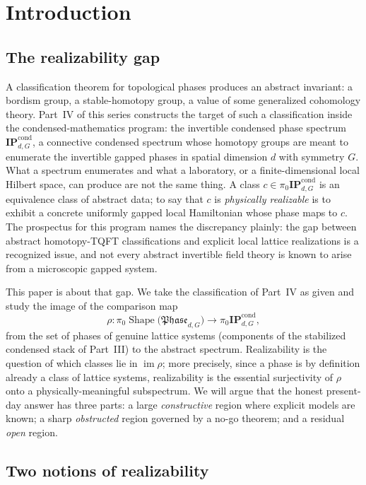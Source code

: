 \documentclass[12pt]{article}
\newcommand{\Shape}{\operatorname{Shape}}      %
\newcommand{\Phase}{\mathfrak{Phase}}          %
\newcommand{\IPcond}{\mathbf{IP}^{\mathrm{cond}}}  %
\newcommand{\real}{\rho}                         %
\newcommand{\im}{\operatorname{im}}
\theoremstyle{definition}
\theoremstyle{remark}
\begin{document}
\tableofcontents

\section{Introduction}
\label{sec:intro}

\subsection{The realizability gap}

A classification theorem for topological phases produces an abstract invariant: a bordism
group, a stable-homotopy group, a value of some generalized cohomology theory. Part~IV of
this series constructs the target of such a classification inside the condensed-mathematics
program: the invertible condensed phase spectrum $\IPcond_{d,G}$, a connective condensed
spectrum whose homotopy groups are meant to enumerate the invertible gapped phases in
spatial dimension $d$ with symmetry $G$. What a spectrum enumerates and what a laboratory,
or a finite-dimensional local Hilbert space, can produce are not the same thing. A class
$c\in\pi_0\IPcond_{d,G}$ is an equivalence class of abstract data; to say that $c$ is
\emph{physically realizable} is to exhibit a concrete uniformly gapped local Hamiltonian
whose phase maps to $c$. The prospectus for this program names the discrepancy plainly:
the gap between abstract homotopy-TQFT classifications and explicit local lattice
realizations is a recognized issue, and not every abstract invertible field theory is known
to arise from a microscopic gapped system.

This paper is about that gap. We take the classification of Part~IV as given and study the
image of the comparison map
\[
  \real \colon \pi_0\Shape\bigl(\Phase_{d,G}\bigr) \longrightarrow \pi_0\IPcond_{d,G},
\]
from the set of phases of genuine lattice systems (components of the stabilized condensed
stack of Part~III) to the abstract spectrum. Realizability is the question of which
classes lie in $\im\real$; more precisely, since a phase is by definition already a class of
lattice systems, realizability is the essential surjectivity of $\real$ onto a
physically-meaningful subspectrum. We will argue that the honest present-day answer has
three parts: a large \emph{constructive} region where explicit models are known; a sharp
\emph{obstructed} region governed by a no-go theorem; and a residual \emph{open} region.

\subsection{Two notions of realizability}
\end{document}
